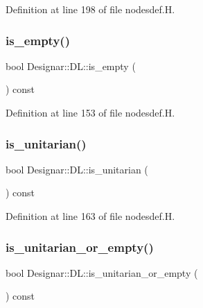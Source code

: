 Definition at line 198 of file nodesdef.\+H.

\mbox{\label{class_designar_1_1_d_l_a01d421aa787edb4087c1b2c266554ca5}} 
\subsubsection{\texorpdfstring{is\+\_\+empty()}{is\_empty()}}
{\footnotesize\ttfamily bool Designar\+::\+D\+L\+::is\+\_\+empty (\begin{DoxyParamCaption}{ }\end{DoxyParamCaption}) const\hspace{0.3cm}{\ttfamily [inline]}}



Definition at line 153 of file nodesdef.\+H.

\mbox{\label{class_designar_1_1_d_l_a262dfc0edc2656658f89b39ee272fac6}} 
\subsubsection{\texorpdfstring{is\+\_\+unitarian()}{is\_unitarian()}}
{\footnotesize\ttfamily bool Designar\+::\+D\+L\+::is\+\_\+unitarian (\begin{DoxyParamCaption}{ }\end{DoxyParamCaption}) const\hspace{0.3cm}{\ttfamily [inline]}}



Definition at line 163 of file nodesdef.\+H.

\mbox{\label{class_designar_1_1_d_l_aae41f00b718a0fe8bed1be458b2dffac}} 
\subsubsection{\texorpdfstring{is\+\_\+unitarian\+\_\+or\+\_\+empty()}{is\_unitarian\_or\_empty()}}
{\footnotesize\ttfamily bool Designar\+::\+D\+L\+::is\+\_\+unitarian\+\_\+or\+\_\+empty (\begin{DoxyParamCaption}{ }\end{DoxyParamCaption}) const\hspace{0.3cm}{\ttfamily [inline]}}



